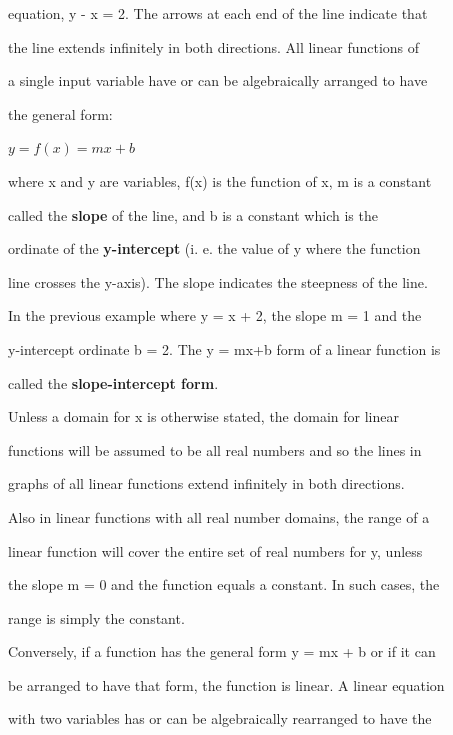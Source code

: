 equation, y - x = 2. The arrows at each end of the line indicate that

the line extends infinitely in both directions. All linear functions of

a single input variable have or can be algebraically arranged to have

the general form:







$y = f(x) = m x + b \,$







where x and y are variables, f(x) is the function of x, m is a constant

called the \textbf{slope} of the line, and b is a constant which is the

ordinate of the \textbf{y-intercept} (i. e. the value of y where the function

line crosses the y-axis). The slope indicates the steepness of the line.

In the previous example where y = x + 2, the slope m = 1 and the

y-intercept ordinate b = 2. The y = mx+b form of a linear function is

called the \textbf{slope-intercept form}.



Unless a domain for x is otherwise stated, the domain for linear

functions will be assumed to be all real numbers and so the lines in

graphs of all linear functions extend infinitely in both directions.

Also in linear functions with all real number domains, the range of a

linear function will cover the entire set of real numbers for y, unless

the slope m = 0 and the function equals a constant. In such cases, the

range is simply the constant.



Conversely, if a function has the general form y = mx + b or if it can

be arranged to have that form, the function is linear. A linear equation

with two variables has or can be algebraically rearranged to have the

